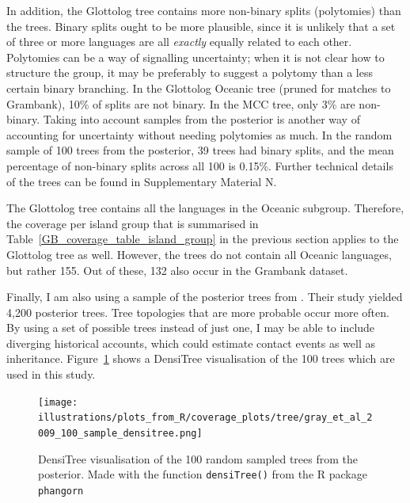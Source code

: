 \documentclass[12pt,letterpaper]{article}
\begin{document}
In addition, the Glottolog tree contains more non-binary splits (polytomies) than the \cite{grayetal_2009} trees. Binary splits ought to be more plausible, since it is unlikely that a set of three or more languages are all \textit{exactly} equally related to each other. Polytomies can be a way of signalling uncertainty; when it is not clear how to structure the group, it may be preferably to suggest a polytomy than a less certain binary branching. In the Glottolog Oceanic tree (pruned for matches to Grambank), 10\% of splits are not binary. In the \cite{grayetal_2009} MCC tree, only 3\% are non-binary. Taking into account samples from the posterior is another way of accounting for uncertainty without needing polytomies as much. In the random sample of 100 trees from the \cite{grayetal_2009} posterior, 39 trees had binary splits, and the mean percentage of non-binary splits across all 100 is 0.15\%. Further technical details of the trees can be found in Supplementary Material N.

The Glottolog tree contains all the languages in the Oceanic subgroup. Therefore, the coverage per island group that is summarised in Table~\ref{GB_coverage_table_island_group} in the previous section applies to the Glottolog tree as well. However, the \cite{grayetal_2009} trees do not contain all Oceanic languages, but rather 155. Out of these, 132 also occur in the Grambank dataset. %

Finally, I am also using a sample of the posterior trees from \cite{grayetal_2009}. Their study yielded 4,200 posterior trees. Tree topologies that are more probable occur more often. By using a set of possible trees instead of just one, I may be able to include diverging historical accounts, which could estimate contact events as well as inheritance. Figure~\ref{densitree_plot} shows a DensiTree visualisation \citep{bouckaert2014densitree} of the 100 trees which are used in this study.

\begin{figure}[ht]
\centering
\texttt{[image: illustrations/plots\_from\_R/coverage\_plots/tree/gray\_et\_al\_2009\_100\_sample\_densitree.png]}
\caption{DensiTree \citep{bouckaert2014densitree} visualisation of the 100 random sampled trees from the \citet{grayetal_2009} posterior. Made with the function \texttt{densiTree()} from the R package \texttt{phangorn} \citep{phangorn}}
\label{densitree_plot}
\end{figure}
\end{document}
